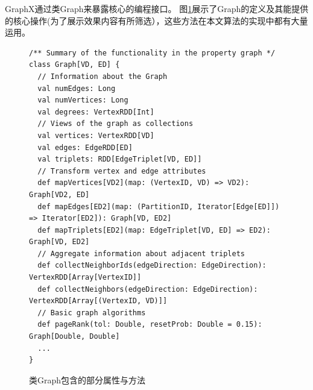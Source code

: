 \documentclass[master]{njuthesis}
\begin{document}
GraphX通过类Graph来暴露核心的编程接口。
图\ref{fig:Graph}展示了Graph的定义及其能提供的核心操作(为了展示效果内容有所筛选），这些方法在本文算法的实现中都有大量运用。
\begin{figure}[h]
  \centering
\begin{lstlisting}
/** Summary of the functionality in the property graph */
class Graph[VD, ED] {
  // Information about the Graph 
  val numEdges: Long
  val numVertices: Long
  val degrees: VertexRDD[Int]
  // Views of the graph as collections 
  val vertices: VertexRDD[VD]
  val edges: EdgeRDD[ED]
  val triplets: RDD[EdgeTriplet[VD, ED]]
  // Transform vertex and edge attributes 
  def mapVertices[VD2](map: (VertexID, VD) => VD2): Graph[VD2, ED]
  def mapEdges[ED2](map: (PartitionID, Iterator[Edge[ED]]) => Iterator[ED2]): Graph[VD, ED2]
  def mapTriplets[ED2](map: EdgeTriplet[VD, ED] => ED2): Graph[VD, ED2]
  // Aggregate information about adjacent triplets 
  def collectNeighborIds(edgeDirection: EdgeDirection): VertexRDD[Array[VertexID]]
  def collectNeighbors(edgeDirection: EdgeDirection): VertexRDD[Array[(VertexID, VD)]]
  // Basic graph algorithms 
  def pageRank(tol: Double, resetProb: Double = 0.15): Graph[Double, Double]
  ...
}

\end{lstlisting}
  \caption{类Graph包含的部分属性与方法}
   \label{fig:Graph}
\end{figure}
\end{document}
